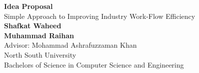 \documentclass{article}
\begin{document}
	\begin{center}
    
    
		\LARGE{\textbf{Idea Proposal}} \\
        \vspace{1em}
        \Large{Simple Approach to Improving Industry Work-Flow Efficiency} \\
        \vspace{1em}
        \normalsize\textbf{Shafkat Waheed} \\
        \normalsize\textbf{Muhammad Raihan} \\
        \vspace{1em}
        \normalsize{Advisor: 
Mohammad Ashrafuzzaman Khan
} \\
        \vspace{1em}
        \normalsize{North South University} \\
        \normalsize{Bachelors of Science in Computer Science and Engineering}
     
	\end{center}
\end{document}

